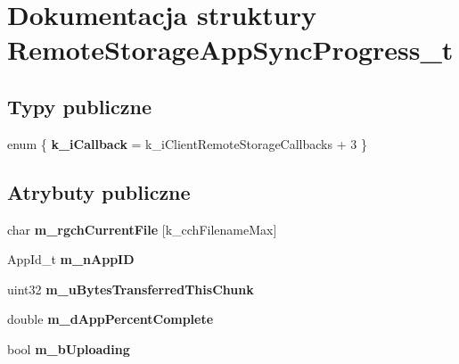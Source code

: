\hypertarget{struct_remote_storage_app_sync_progress__t}{}\section{Dokumentacja struktury Remote\+Storage\+App\+Sync\+Progress\+\_\+t}
\label{struct_remote_storage_app_sync_progress__t}
\subsection*{Typy publiczne}
\begin{DoxyCompactItemize}
\item 
\mbox{\label{struct_remote_storage_app_sync_progress__t_afe52da4956e7bab5ca5f83702418c103}} 
enum \{ {\bfseries k\+\_\+i\+Callback} = k\+\_\+i\+Client\+Remote\+Storage\+Callbacks + 3
 \}
\end{DoxyCompactItemize}
\subsection*{Atrybuty publiczne}
\begin{DoxyCompactItemize}
\item 
\mbox{\label{struct_remote_storage_app_sync_progress__t_aa14996fe7bb562707aed6e3334e21428}} 
char {\bfseries m\+\_\+rgch\+Current\+File} \mbox{[}k\+\_\+cch\+Filename\+Max\mbox{]}
\item 
\mbox{\label{struct_remote_storage_app_sync_progress__t_a2655556742a52c21353e0585789decfe}} 
App\+Id\+\_\+t {\bfseries m\+\_\+n\+App\+ID}
\item 
\mbox{\label{struct_remote_storage_app_sync_progress__t_a07f1613bb15f5be10b302daed1a77573}} 
uint32 {\bfseries m\+\_\+u\+Bytes\+Transferred\+This\+Chunk}
\item 
\mbox{\label{struct_remote_storage_app_sync_progress__t_a5405cb9788e5a82201dbf8a36462af82}} 
double {\bfseries m\+\_\+d\+App\+Percent\+Complete}
\item 
\mbox{\label{struct_remote_storage_app_sync_progress__t_a7db764d8ba8789531108c147ec7d1e58}} 
bool {\bfseries m\+\_\+b\+Uploading}
\end{DoxyCompactItemize}


